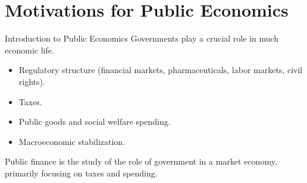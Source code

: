 \documentclass[8pt]{extarticle}
\title{}
\author{Avinash Iyer}
\date{}
\begin{document}
  \section*{Motivations for Public Economics}%
  
  \begin{problem}{Introduction to Public Economics}
    Governments play a crucial role in much economic life.
    \begin{itemize}
      \item Regulatory structure (financial markets, pharmaceuticals, labor markets, civil rights).
      \item Taxes.
      \item Public goods and social welfare spending.
      \item Macroeconomic stabilization.
    \end{itemize}
   Public finance is the study of the role of government in a market economy, primarily focusing on taxes and spending.\\


\end{problem}
\end{document}

